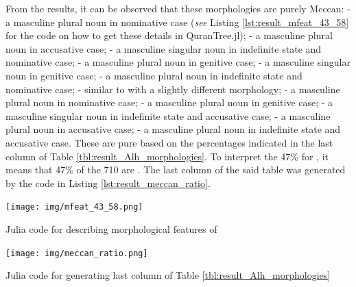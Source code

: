 From the results, it can be observed that these morphologies are purely Meccan:    - a masculine plural noun in nominative case (\textit{see} Listing \ref{lst:result_mfeat_43_58} for the code on how to get these details in QuranTree.jl);   - a masculine plural noun in accusative case;   - a masculine singular noun in indefinite state and nominative case;   - a masculine plural noun in genitive case;   - a masculine singular noun in genitive case;   - a masculine plural noun in indefinite state and nominative case;   - similar to   with a slightly different morphology;   - a masculine plural noun in nominative case;   - a masculine plural noun in genitive case;   - a masculine singular noun in indefinite state and accusative case;   - a masculine plural noun in accusative case;   - a masculine plural noun in indefinite state and accusative case. These are pure     based on the percentages indicated in the last column of Table \ref{tbl:result_Alh_morphologies}. To interpret the 47\% for  , it means that 47\% of the 710   are  . The last column of the said table was generated by the code in Listing \ref{lst:result_meccan_ratio}.

\begin{listing2}[!t]
    \centering
    \texttt{[image: img/mfeat\_43\_58.png]}
    \caption{Julia code for describing morphological features of  }
    \label{lst:result_mfeat_43_58}
\end{listing2}

\begin{listing2}[!t]
    \centering
    \texttt{[image: img/meccan\_ratio.png]}
    \caption{Julia code for generating last column of Table \ref{tbl:result_Alh_morphologies}}
    \label{lst:result_meccan_ratio}
\end{listing2}

